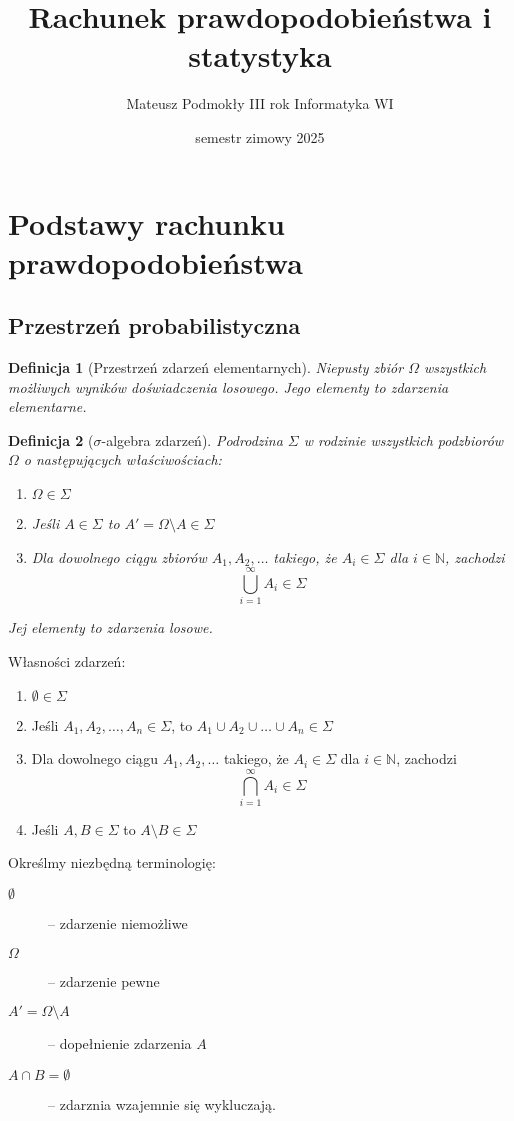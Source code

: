 \documentclass[11pt, leqno]{scrartcl}
\title{Rachunek prawdopodobieństwa i statystyka}
\author{Mateusz Podmokły III rok Informatyka WI}
\date{semestr zimowy 2025}
\theoremstyle{mydefinition}
\newtheorem{definition}{Definicja}[subsection]
\theoremstyle{mytheorem}
\begin{document}
    \maketitle
    \section{Podstawy rachunku prawdopodobieństwa}
    \subsection{Przestrzeń probabilistyczna}
    \begin{definition}[Przestrzeń zdarzeń elementarnych]
        Niepusty zbiór $\Omega$ wszystkich możliwych wyników
        doświadczenia losowego. Jego elementy to zdarzenia elementarne.
    \end{definition}
    \begin{definition}[$\sigma$-algebra zdarzeń]
        Podrodzina $\Sigma$ w rodzinie wszystkich podzbiorów $\Omega$
        o następujących właściwościach:
        \begin{enumerate}
            \item $\Omega \in \Sigma$
            \item Jeśli $A \in \Sigma$ to $A'=\Omega \setminus A \in
                \Sigma$
            \item Dla dowolnego ciągu zbiorów $A_1,A_2,\dots$ takiego,
                że $A_i \in \Sigma$ dla $i \in \mathbb{N}$, zachodzi
                \[
                    \bigcup_{i=1}^{\infty}A_i \in \Sigma
                \]
        \end{enumerate}
        Jej elementy to zdarzenia losowe.
    \end{definition}
    \noindent
    Własności zdarzeń:
    \begin{enumerate}
        \item $\emptyset \in \Sigma$
        \item Jeśli $A_1,A_2,\dots,A_n \in \Sigma$, to
            $A_1 \cup A_2 \cup \dots \cup A_n \in \Sigma$
        \item Dla dowolnego ciągu $A_1,A_2,\dots$ takiego, że
            $A_i \in \Sigma$ dla $i \in \mathbb{N}$, zachodzi
            \[
                \bigcap_{i=1}^{\infty}A_i \in \Sigma
            \]
        \item Jeśli $A,B \in \Sigma$ to $A \setminus B \in \Sigma$
    \end{enumerate}
    Określmy niezbędną terminologię:
    \begin{description}
        \item[$\emptyset$] -- zdarzenie niemożliwe
        \item[$\Omega$] -- zdarzenie pewne
        \item[$A'=\Omega \setminus A$] -- dopełnienie zdarzenia $A$
        \item[$A \cap B= \emptyset$] -- zdarznia wzajemnie się
            wykluczają.
    \end{description}
\end{document}
